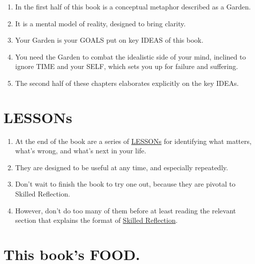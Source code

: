 \documentclass[
]{book}
\providecommand{\tightlist}{%
  \setlength{\itemsep}{0pt}\setlength{\parskip}{0pt}}
\begin{document}
\begin{enumerate}
\def\labelenumi{\arabic{enumi}.}
\setcounter{enumi}{35}
\tightlist
\item
  In the first half of this book is a conceptual metaphor described as a Garden.
\item
  It is a mental model of reality, designed to bring clarity.
\item
  Your Garden is your GOALS put on key IDEAS of this book.
\item
  You need the Garden to combat the idealistic side of your mind, inclined to ignore TIME and your SELF, which sets you up for failure and suffering.
\item
  The second half of these chapters elaborates explicitly on the key IDEAs.
\end{enumerate}

\hypertarget{lessons}{%
\section{LESSONs}\label{lessons}}

\begin{enumerate}
\def\labelenumi{\arabic{enumi}.}
\setcounter{enumi}{40}
\tightlist
\item
  At the end of the book are a series of \protect\hyperlink{zero-or-one}{LESSONs} for identifying what matters, what's wrong, and what's next in your life.
\item
  They are designed to be useful at any time, and especially repeatedly.
\item
  Don't wait to finish the book to try one out, because they are pivotal to Skilled Reflection.
\item
  However, don't do too many of them before at least reading the relevant section that explains the format of \protect\hyperlink{skilled-reflection}{Skilled Reflection}.
\end{enumerate}

\hypertarget{this-books-food.}{%
\section{This book's FOOD.}\label{this-books-food.}}
\end{document}
